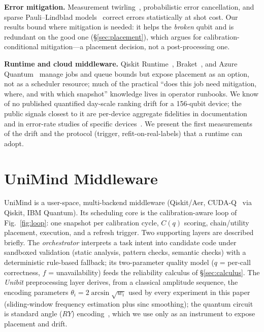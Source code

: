 \documentclass[journal,10pt,twocolumn]{IEEEtran}
\begin{document}
\textbf{Error mitigation.} Measurement twirling~\cite{nation2023,bravyi2021meas}, probabilistic error cancellation,
and sparse Pauli--Lindblad models~\cite{vanberg2023,temme2017} correct errors statistically at shot cost. Our results
bound where mitigation is needed: it helps the \emph{broken} qubit and is redundant on the good one
(\S\ref{sec:placement}), which argues for calibration-conditional mitigation---a placement decision, not a
post-processing one.

\textbf{Runtime and cloud middleware.} Qiskit Runtime~\cite{ibmrtime}, Braket~\cite{braket}, and Azure
Quantum~\cite{azureq} manage jobs and queue bounds but expose placement as an option, not as a scheduler resource;
much of the practical ``does this job need mitigation, where, and with which snapshot'' knowledge lives in operator
runbooks. We know of no published quantified day-scale ranking drift for a 156-qubit device; the public signals
closest to it are per-device aggregate fidelities in documentation~\cite{ibmcalib} and in error-rate studies of
specific devices~\cite{kim2023utility}. We present the first measurements of the drift and the protocol (trigger,
refit-on-real-labels) that a runtime can adopt.

\section{UniMind Middleware}
\label{sec:architecture}
UniMind is a user-space, multi-backend middleware (Qiskit/Aer, CUDA-Q~\cite{cuquantum} via Qiskit, IBM Quantum).
Its scheduling core is the calibration-aware loop of Fig.~\ref{fig:loop}: one snapshot per calibration cycle,
$C(q)$ scoring, chain/utility placement, execution, and a refresh trigger. Two supporting layers are described
briefly. The \emph{orchestrator} interprets a task intent into candidate code under sandboxed validation (static
analysis, pattern checks, semantic checks) with a deterministic rule-based fallback; its two-parameter quality
model ($q$ = per-call correctness, $f$ = unavailability) feeds the reliability calculus of \S\ref{sec:calculus}.
The \emph{Unibit} preprocessing layer derives, from a classical amplitude sequence, the encoding parameters
$\theta_i=2\arcsin\sqrt{w_i}$ used by every experiment in this paper (sliding-window frequency estimation plus
sinc smoothing); the quantum circuit is standard angle ($RY$) encoding~\cite{schuld2018,hhavlicek2019}, which we
use only as an instrument to expose placement and drift.
\end{document}
